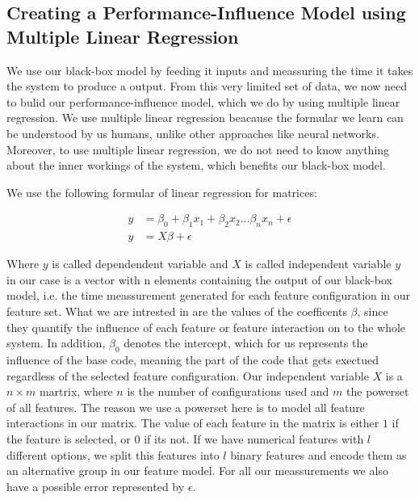 \subsection{Creating a Performance-Influence Model using Multiple Linear Regression}
We use our black-box model by feeding it inputs and meassuring the time it takes the system to produce a output. From this 
very limited set of data, we now need to bulid our performance-influence model, which we do by using multiple linear regression.
We use multiple linear regression beacause the formular we learn can be understood by us humans, unlike other approaches like neural networks.
Moreover, to use multiple linear regression, we do not need to know anything about the inner workings of the system,
which benefits our black-box model. \cite{Linear-Regression-Performance}

We use the following formular of linear regression for matrices\cite{Linear-Regression-Performance}:

\begin{align*}
        y &= \beta_0 + \beta_1 x_1 + \beta_2 x_2 ... \beta_n x_n + \epsilon   \\
        y &= X \beta + \epsilon
\end{align*}


Where $y$ is called dependendent variable and $X$ is called independent variable $y$ in our case is a vector with n elements containing
the output of our black-box model, i.e. the time meassurement generated for each feature configuration in our feature set. What we
are intrested in are the values of the coefficents $\beta$, since they quantify the influence of each feature or feature interaction
on to the whole system. In addition, $\beta_0$ denotes the intercept, which for us represents the influence of the base code, meaning
the part of the code that gets exectued regardless of the selected feature configuration.
Our independent variable $X$ is a $n \times m$ martrix, where $n$ is the number of configurations used and $m$ the powerset of all
features. The reason we use a powerset here is to model all feature interactions in our matrix.
The value of each feature in the matrix is either $1$ if the feature is selected, or $0$ if its not. If we have numerical features with $l$
different options, we split this features into $l$ binary features and encode them as an alternative group in our feature model.
For all our meassurements we also have a possible error represented by $\epsilon$. \cite{Linear-Regression}


